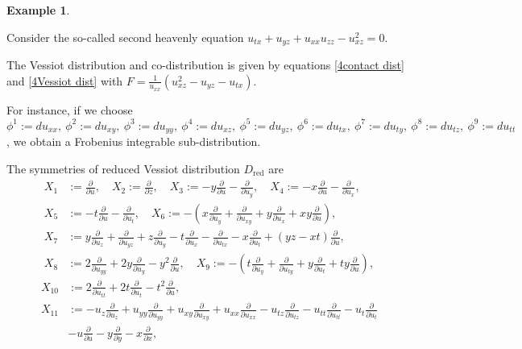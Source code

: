 \documentclass[a4paper, 11pt]{amsart}
\theoremstyle{definition}
\newtheorem{example}[theorem]{Example}
\begin{document}
\begin{example}\label{exp:easy phi}

Consider the so-called second heavenly equation \cite{Sergey}
$u_{tx}+u_{yz}+u_{xx}u_{zz}-u_{xz}^2=0.$

\noindent The Vessiot distribution and co-distribution is given by equations \eqref{4contact dist} and \eqref{4Vessiot dist}  with $F=\frac{1}{u_{xx}}(u_{xz}^2-u_{yz}-u_{tx}).$

For instance, if we choose $\phi^1:=du_{xx},~ \phi^2:=du_{xy},~ \phi^3:=du_{yy},~ \phi^4:=du_{xz},~ \phi^5:=du_{yz},~ \phi^6:=du_{tx},~ \phi^7:=du_{ty},~ \phi^8:=du_{tz},~ \phi^9:=du_{tt}$, we obtain a Frobenius integrable sub-distribution.

The symmetries of reduced Vessiot distribution $D_\text{red}$ are
\begin{align*}
X_1&:={\frac{\partial}{\partial{u}}},\quad X_2:={\frac{\partial}{\partial{z}}}, \quad X_3:=-y{\frac{\partial}{\partial{u}}}-{\frac{\partial}{\partial{u_y}}},\quad X_4:=-x{\frac{\partial}{\partial{u}}}-{\frac{\partial}{\partial{u_x}}},\\
X_5&:=-t{\frac{\partial}{\partial{u}}}-{\frac{\partial}{\partial{u_t}}},\quad X_6:=-(x{\frac{\partial}{\partial{u_y}}}+{\frac{\partial}{\partial{u_{xy}}}}+y{\frac{\partial}{\partial{u_x}}}+xy{\frac{\partial}{\partial{u}}}),\\
X_7&:=y{\frac{\partial}{\partial{u_{z}}}}+{\frac{\partial}{\partial{u_{yz}}}}+z{\frac{\partial}{\partial{u_{y}}}}-t{\frac{\partial}{\partial{u_x}}}-{\frac{\partial}{\partial{u_{tx}}}}-x{\frac{\partial}{\partial{u_t}}}+(yz-xt){\frac{\partial}{\partial{u}}},\\
X_8&:=2{\frac{\partial}{\partial{u_{yy}}}}+2y{\frac{\partial}{\partial{u_y}}}-y^2{\frac{\partial}{\partial{u}}},\quad X_9:=-(t{\frac{\partial}{\partial{u_y}}}+{\frac{\partial}{\partial{u_{ty}}}}+y{\frac{\partial}{\partial{u_t}}}+ty{\frac{\partial}{\partial{u}}}),
\end{align*}
\begin{align*}
X_{10}&:=2{\frac{\partial}{\partial{u_{tt}}}}+2t{\frac{\partial}{\partial{u_t}}}-t^2{\frac{\partial}{\partial{u}}},\\ X_{11}&:=-u_{z}{\frac{\partial}{\partial{u_{z}}}}+u_{yy}{\frac{\partial}{\partial{u_{yy}}}}+u_{xy}{\frac{\partial}{\partial{u_{xy}}}}+u_{xx}{\frac{\partial}{\partial{u_{xx}}}}-u_{tz}{\frac{\partial}{\partial{u_{tz}}}}-u_{tt}{\frac{\partial}{\partial{u_{tt}}}}
-u_t{\frac{\partial}{\partial{u_t}}}\\&-u{\frac{\partial}{\partial{u}}}-y{\frac{\partial}{\partial{y}}}-x{\frac{\partial}{\partial{x}}},\\

\end{align*}
\end{example}
\end{document}
